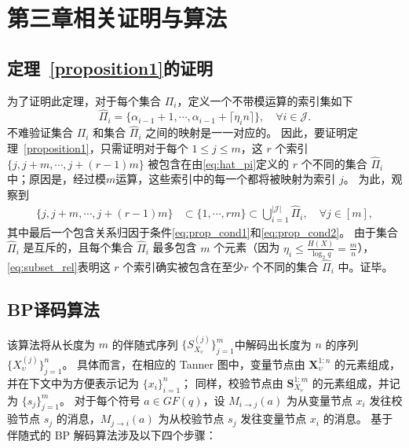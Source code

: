 


\chapter{第三章相关证明与算法}

\section{定理~\ref{proposition1}的证明} \label{<appendix-proposition1>}
为了证明此定理，对于每个集合 $\Pi_i$，定义一个不带模运算的索引集如下
\begin{equation}
	\hat{\Pi}_i = \{ \alpha_{i-1} + 1, \cdots, \alpha_{i-1} + \lceil \eta_i n \rceil \}, \quad \forall i \in \mathcal{J}.
	\label{eq:hat_pi}
\end{equation}
不难验证集合 $\Pi_i$ 和集合 $\hat{\Pi}_i$ 之间的映射是一一对应的。
因此，要证明定理~\ref{proposition1}，只需证明对于每个 $1 \leq j \leq m$，这 $r$ 个索引 $\{j, j+m, \cdots, j+(r-1)m\}$ 被包含在由\eqref{eq:hat_pi}定义的 $r$ 个不同的集合 $\hat{\Pi}_i$ 中；原因是，经过模$m$运算，这些索引中的每一个都将被映射为索引 $j$。
为此，观察到
\begin{align}
	\{j, j+m, \cdots, j+(r-1)m\} &\subset \{1, \cdots, rm\} 
	\subset \bigcup_{i=1}^{|\mathcal{J}|} \hat{\Pi}_i, \quad \forall j \in [m], \label{eq:subset_rel} 
\end{align}
其中最后一个包含关系归因于条件\eqref{eq:prop_cond1}和\eqref{eq:prop_cond2}。
由于集合 $\hat{\Pi}_i$ 是互斥的，且每个集合 $\hat{\Pi}_i$ 最多包含 $m$ 个元素（因为 $\eta_i \leq \frac{H(X)}{\log_2 q} = \frac{m}{n}$），\eqref{eq:subset_rel}表明这 $r$ 个索引确实被包含在至少$r$ 个不同的集合 $\hat{\Pi}_i$ 中。证毕。





\section{BP译码算法}\label{appendix-BP}
该算法将从长度为 $m$ 的伴随式序列 $\{S_{X_\upsilon}^{(j)}\}_{j=1}^m$中解码出长度为 $n$ 的序列 $\{X_\upsilon^{(j)}\}_{j=1}^n$。
具体而言，在相应的 Tanner 图中，变量节点由 $\mathbf{X}_\upsilon^{1:n}$ 的元素组成，并在下文中为方便表示记为 $\{x_i\}_{i=1}^n$；
同样，校验节点由 $\mathbf{S}_{X_\upsilon}^{1:m}$ 的元素组成，并记为 $\{s_j\}_{j=1}^m$。
对于每个符号 $a \in GF(q)$，设 $M_{i \to j}(a)$ 为从变量节点 $x_i$ 发往校验节点 $s_j$ 的消息，$M_{j \to i}(a)$ 为从校验节点 $s_j$ 发往变量节点 $x_i$ 的消息。
基于伴随式的 BP 解码算法涉及以下四个步骤：

